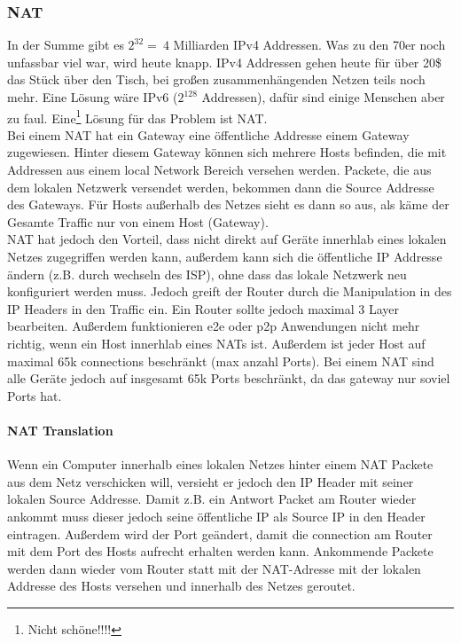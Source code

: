 		\subsubsection{NAT}
			In der Summe gibt es $2^{32} = ~4$ Milliarden IPv4 Addressen. Was zu den 70er noch unfassbar viel war, wird heute knapp. IPv4 Addressen gehen heute für über 20\$ das Stück über den Tisch, bei großen zusammenhängenden Netzen teils noch mehr. Eine Lösung wäre IPv6 ($2^{128}$ Addressen), dafür sind einige Menschen aber zu faul. Eine\footnote{Nicht schöne!!!!} Lösung für das Problem ist NAT. \\
			Bei einem NAT hat ein Gateway eine öffentliche Addresse einem Gateway zugewiesen. Hinter diesem Gateway können sich mehrere Hosts befinden, die mit Addressen aus einem local Network Bereich versehen werden. Packete, die aus dem lokalen Netzwerk versendet werden, bekommen dann die Source Addresse des Gateways. Für Hosts außerhalb des Netzes sieht es dann so aus, als käme der Gesamte Traffic nur von einem Host (Gateway). \\
			NAT hat  jedoch den Vorteil, dass nicht direkt auf Geräte innerhlab eines lokalen Netzes zugegriffen werden kann, außerdem kann sich die öffentliche IP Addresse ändern (z.B. durch wechseln des ISP), ohne dass das lokale Netzwerk neu konfiguriert werden muss. Jedoch greift der Router durch die Manipulation in des IP Headers in den Traffic ein. Ein Router sollte jedoch maximal 3 Layer bearbeiten. Außerdem funktionieren e2e oder p2p Anwendungen nicht mehr richtig, wenn ein Host innerhlab eines NATs ist. Außerdem ist jeder Host auf maximal 65k connections beschränkt (max anzahl Ports). Bei einem NAT sind alle Geräte jedoch auf insgesamt 65k Ports beschränkt, da das gateway nur soviel Ports hat.

			\paragraph{NAT Translation}
				Wenn ein Computer innerhalb eines lokalen Netzes hinter einem NAT Packete aus dem Netz verschicken will, versieht er jedoch den IP Header mit seiner lokalen Source Addresse. Damit z.B. ein Antwort Packet am Router wieder ankommt muss dieser jedoch seine öffentliche IP als Source IP in den Header eintragen. Außerdem wird der Port geändert, damit die connection am Router mit dem Port des Hosts aufrecht erhalten werden kann. Ankommende Packete werden dann wieder vom Router statt mit der NAT-Adresse mit der lokalen Addresse des Hosts versehen und innerhalb des Netzes geroutet. 

